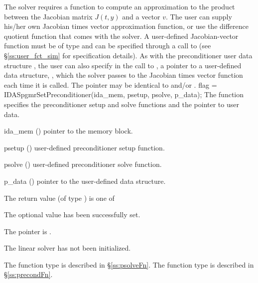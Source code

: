 The 
{\idaspgmr} solver requires a function to compute an approximation to the
product between the Jacobian matrix $J(t,y)$ and a vector $v$.
The user can supply his/her own Jacobian times vector approximation function, 
or use the difference quotient function  
that comes with the {\idaspgmr} solver.
A user-defined Jacobian-vector function must be of type  and 
can be specified through a call to  
(see \S\ref{ss:user_fct_sim} for specification details).
As with the preconditioner user data structure , 
the user can also specify in the call to , a pointer to a 
user-defined data structure, , which
the {\idaspgmr} solver passes to the Jacobian times vector function 
each time it is called.  
The pointer  may be identical to  and/or .
{
  flag = IDASpgmrSetPreconditioner(ida\_mem, psetup, psolve, p\_data);
}
{
  The function  specifies the preconditioner
  setup and solve functions and the pointer to user data.
}
{
  \begin{args}
  \item[ida\_mem] ()
    pointer to the {\ida} memory block.
  \item[psetup] ()
    user-defined preconditioner setup function.
  \item[psolve] ()
    user-defined preconditioner solve function.
  \item[p\_data] ()
     pointer to the user-defined data structure.
  \end{args}
}
{
  The return value  (of type ) is one of
  \begin{args}
  \item[\Id{IDASPGMR\_SUCCESS}] 
    The optional value has been successfully set.
  \item[\Id{IDASPGMR\_MEM\_NULL}]
    The  pointer is .
  \item[\Id{IDASPGMR\_LMEM\_NULL}]
    The {\idaspgmr} linear solver has not been initialized.
  \end{args}
}
{
   The function type  is described in \S\ref{ss:psolveFn}.
   The function type  is described in \S\ref{ss:precondFn}.
}
